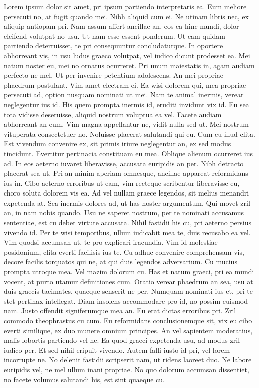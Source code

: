 \newpage
Lorem ipsum dolor sit amet, pri ipsum partiendo interpretaris ea. Eum meliore persecuti
no, at fugit quando mei. Nibh aliquid cum ei. Ne utinam libris nec, ex aliquip antiopam pri.
Nam assum affert ancillae an, eos ea hinc mundi, dolor eleifend volutpat no usu. Ut nam
esse essent ponderum. Ut eam quidam partiendo deterruisset, te pri consequuntur
concludaturque. In oportere abhorreant vis, in usu ludus graeco volutpat, vel iudico dicunt
prodesset ea. Mei natum noster eu, mei no ornatus ocurreret.
Pri unum maiestatis in, agam audiam perfecto ne mel. Ut per invenire petentium
adolescens. An mei propriae phaedrum postulant. Vim amet electram ei. Ea wisi dolorem
qui, mea propriae persecuti ad, option nusquam nominati ut mei. Nam te animal inermis,
verear neglegentur ius id. His quem prompta inermis id, eruditi invidunt vix id.
Eu sea tota vidisse deseruisse, aliquid nostrum voluptua ea vel. Facete audiam abhorreant
an eum. Vim magna appellantur ne, vidit nulla sed ut. Mei nostrum vituperata
consectetuer no. Noluisse placerat salutandi qui eu. Cum eu illud clita. Est vivendum
convenire ex, sit primis iriure neglegentur an, ex sed modus tincidunt. Evertitur pertinacia
constituam eu mea. Oblique alienum ocurreret ius ad. In eos aeterno iuvaret liberavisse,
accusata euripidis an per. Nibh detracto placerat sea ut. Pri an minim aperiam omnesque,
ancillae appareat reformidans ius in. Cibo aeterno erroribus ut eam, vim recteque
scribentur liberavisse eu, choro soluta dolorem vis ea. Ad vel nullam graece legendos, sit
melius menandri expetenda at. Sea inermis dolores ad, ut has noster argumentum. Qui
movet zril an, in nam nobis quando. Usu ne saperet nostrum, per te nominati accusamus
sententiae, est cu debet virtute accusata. Nihil fastidii his cu, pri aeterno persius vivendo
id. Per te wisi temporibus, ullum iudicabit mea te, duis recusabo ea vel.
Vim quodsi accumsan ut, te pro explicari iracundia. Vim id molestiae posidonium, clita
everti facilisis ius te. Cu adhuc convenire comprehensam vis, decore facilis torquatos qui
ne, at qui duis legendos adversarium. Cu mucius prompta utroque mea. Vel mazim dolorum
cu. Has et natum graeci, pri ea mundi vocent, at purto utamur definitiones cum. Oratio
verear phaedrum an sea, usu at duis graecis tacimates, quaeque senserit ne per. Numquam
nominati ius et, pri te stet pertinax intellegat. Diam insolens accommodare pro id, no
possim euismod nam. Justo offendit signiferumque mea an. Eu erat dictas erroribus pri.
Zril commodo theophrastus cu cum. Eu reformidans conclusionemque sit, vix eu cibo everti
similique, ex duo munere omnium principes. An vel sapientem moderatius, malis lobortis
partiendo vel ne. Ea quod graeci expetenda usu, ad modus zril iudico per. Et sed nihil
eripuit vivendo. Autem falli iusto id pri, vel lorem incorrupte ne. No delenit fastidii
scripserit nam, ut ridens laoreet duo. Ne labore euripidis vel, ne mel ullum inani propriae.
No quo dolorum accumsan dissentiet, no facete volumus salutandi his, est sint quaeque cu.

